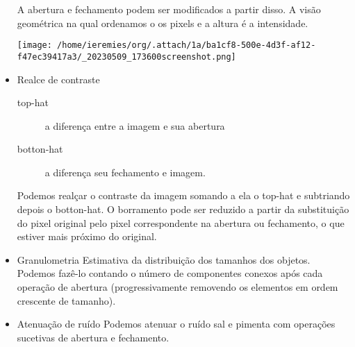 \documentclass[twocolumn, 10pt]{article}
\begin{document}
\begin{itemize}
A abertura e fechamento podem ser modificados a partir disso. A visão geométrica na qual ordenamos o os pixels e a altura é a intensidade.
\begin{center}
\texttt{[image: /home/ieremies/org/.attach/1a/ba1cf8-500e-4d3f-af12-f47ec39417a3/\_20230509\_173600screenshot.png]}
\end{center}
\item Realce de contraste
\label{sec:org1ee8b60}
\begin{description}
\item[{top-hat}] a diferença entre a imagem e sua abertura
\item[{botton-hat}] a diferença seu fechamento e imagem.
\end{description}

Podemos realçar o contraste da imagem somando a ela o top-hat e subtriando depois o botton-hat.
O borramento pode ser reduzido a partir da substituição do pixel original pelo pixel correspondente na abertura ou fechamento, o que estiver mais próximo do original.
\item Granulometria
\label{sec:org2a794ad}
Estimativa da distribuição dos tamanhos dos objetos.
Podemos fazê-lo contando o número de componentes conexos após cada operação de abertura (progressivamente removendo os elementos em ordem crescente de tamanho).
\item Atenuação de ruído
\label{sec:org46f3025}
Podemos atenuar o ruído sal e pimenta com operações sucetivas de abertura e fechamento.
\end{itemize}
\end{document}
